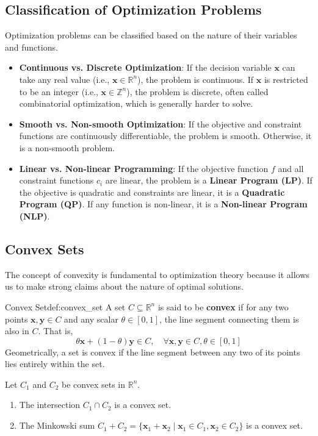 \documentclass{MathNote}
\begin{document}
\subsection{Classification of Optimization Problems}

Optimization problems can be classified based on the nature of their variables and functions.
\begin{itemize}
	\item \textbf{Continuous vs. Discrete Optimization}: If the decision variable $\bm{x}$ can take any real value (i.e., $\bm{x} \in \mathbb{R}^n$), the problem is continuous. If $\bm{x}$ is restricted to be an integer (i.e., $\bm{x} \in \mathbb{Z}^n$), the problem is discrete, often called combinatorial optimization, which is generally harder to solve.
	\item \textbf{Smooth vs. Non-smooth Optimization}: If the objective and constraint functions are continuously differentiable, the problem is smooth. Otherwise, it is a non-smooth problem.
	\item \textbf{Linear vs. Non-linear Programming}: If the objective function $f$ and all constraint functions $c_i$ are linear, the problem is a \textbf{Linear Program (LP)}. If the objective is quadratic and constraints are linear, it is a \textbf{Quadratic Program (QP)}. If any function is non-linear, it is a \textbf{Non-linear Program (NLP)}.
\end{itemize}

\subsection{Convex Sets}
The concept of convexity is fundamental to optimization theory because it allows us to make strong claims about the nature of optimal solutions.

\begin{definition}{Convex Set}{def:convex_set}
	A set $C \subseteq \mathbb{R}^n$ is said to be \textbf{convex} if for any two points $\bm{x}, \bm{y} \in C$ and any scalar $\theta \in [0, 1]$, the line segment connecting them is also in $C$. That is,
	$$
	\theta \bm{x} + (1 - \theta)\bm{y} \in C, \quad \forall \bm{x}, \bm{y} \in C, \theta \in [0, 1]
	$$
	Geometrically, a set is convex if the line segment between any two of its points lies entirely within the set.
\end{definition}

\begin{proposition}\label{prop:convex_sets_properties}
	Let $C_1$ and $C_2$ be convex sets in $\mathbb{R}^n$.
	\begin{enumerate}
		\item The intersection $C_1 \cap C_2$ is a convex set.
		\item The Minkowski sum $C_1 + C_2 = \{\bm{x}_1 + \bm{x}_2 \mid \bm{x}_1 \in C_1, \bm{x}_2 \in C_2\}$ is a convex set.
	\end{enumerate}
\end{proposition}
\end{document}
